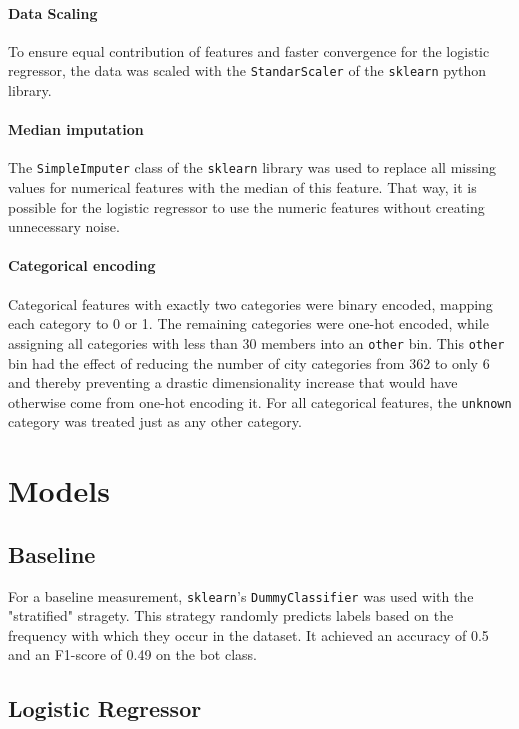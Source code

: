 \documentclass[twocolumn]{article}
\begin{document}
\paragraph{Data Scaling}
To ensure equal contribution of features and faster convergence for the logistic regressor, the data was scaled with the \texttt{StandarScaler} of the \texttt{sklearn} python library.

\paragraph{Median imputation}
The \texttt{SimpleImputer} class of the \texttt{sklearn} library was used to replace all missing values for numerical features with the median of this feature. That way, it is possible for the logistic regressor to use the numeric features without creating unnecessary noise. 

\paragraph{Categorical encoding}
Categorical features with exactly two categories were binary encoded, mapping each category to 0 or 1. The remaining categories were one-hot encoded, while assigning all categories with less than 30 members into an \texttt{other} bin. This \texttt{other} bin had the effect of reducing the number of city categories from 362 to only 6 and thereby preventing a drastic dimensionality increase that would have otherwise come from one-hot encoding it. For all categorical features, the \texttt{unknown} category was treated just as any other category.

\section{Models}

\subsection{Baseline}

For a baseline measurement, \texttt{sklearn}'s \texttt{DummyClassifier} was used with the "stratified" stragety. This strategy randomly predicts labels based on the frequency with which they occur in the dataset. It achieved an accuracy of 0.5 and an F1-score of 0.49 on the bot class.

\subsection{Logistic Regressor}
\end{document}
